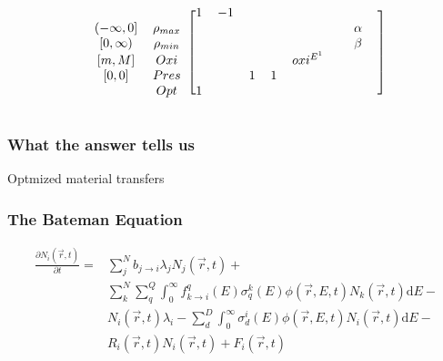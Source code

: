 \documentclass{beamer}
\begin{document}
\begin{frame}[shrink=22]
\begin{equation*}
\begin{blockarray}{cccccccccc}
\begin{block}{cc[cccccccc]}
                               &                   & 1                 &
            -1 \\
            {(-\infty,0]}      & \rho_{max}        &                   &
                               &                   &                   &
                               &                   & \alpha            &
             \\
            {[0,\infty)}       & \rho_{min}        &                   &
                               &                   &                   &
                               &                   & \beta             & 
             \\
            {[m,M]}        & Oxi               &                   &
                               &                   &                   &
             oxi^{E^{1}}       &                   &                   &
             \\
            {[0,0]}            & Pres              &                   &
                               & 1                 & 1                 &
                               &                   &                   &
             \\
                               & Opt               & 1                 &
                               &                   &                   &
                               &                   &                   &
             \\
            \end{block}
        \end{blockarray}
    \end{equation*}

\end{frame}

\begin{frame}
\frametitle{What the answer tells us}

Optmized material transfers

\end{frame}

\begin{frame}
\frametitle{The Bateman Equation}

    \begin{equation}
    \begin{split}
        \frac{\partial N_{i}(\vec{r},t)}{\partial t} = & \sum \limits_{j}^{N} 
        b_{j \rightarrow i} \lambda_{j} N_{j}(\vec{r}, t) + \\
        & \sum \limits_{k}^{N}
        \sum \limits_{q}^{Q} \int_{0}^{\infty} f_{k \rightarrow i}^{q}(E)
        \sigma_{q}^{k}(E) \phi(\vec{r},E,t) N_{k}(\vec{r},t)\mathrm{d}E - \\
        & N_{i}(\vec{r},t) \lambda_{i} - \sum \limits_{d}^{D} \int_{0}^{\infty}
        \sigma_{d}^{i}(E) \phi(\vec{r},E,t) N_{i}(\vec{r},t)\mathrm{d}E - \\
        & R_{i}(\vec{r},t) N_{i}(\vec{r},t) + F_{i}(\vec{r},t)
    \end{split}
    \end{equation}

\end{frame}
\end{document}
